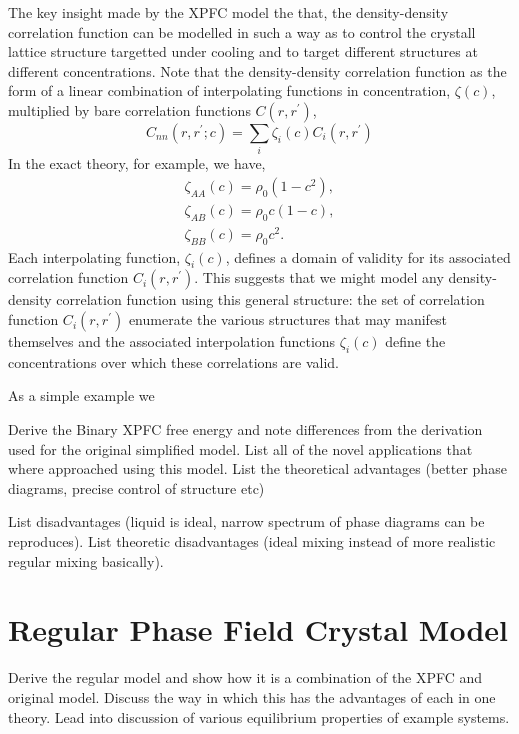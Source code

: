 The key insight made by the XPFC model the that, the density-density correlation 
function can be modelled in such a way as to control the crystall lattice structure
targetted under cooling and to target different structures at different concentrations.
Note that the density-density correlation function as the form of a linear combination
of interpolating functions in concentration, $\zeta(c)$, multiplied by bare correlation
functions $C(r, r^\prime)$,
%
\begin{equation}
    C_{nn}(r, r^\prime; c) = \sum_i \zeta_i(c) C_i(r, r^\prime)
\end{equation}
%
In the exact theory, for example, we have,
%
\begin{gather}
    \zeta_{AA}(c) = \rho_0 (1 - c^2), \\
    \zeta_{AB}(c) = \rho_0 c (1 - c ), \\
    \zeta_{BB}(c) = \rho_0 c^2.
\end{gather}
%
Each interpolating function, $\zeta_i(c)$, defines a domain of validity for its
associated correlation function $C_i(r, r^\prime)$. This suggests that we might model
any density-density correlation function using this general structure: the set of 
correlation function $C_i(r, r^\prime)$ enumerate the various structures that may
manifest themselves and the associated interpolation functions $\zeta_i(c)$ define
the concentrations over which these correlations are valid.

As a simple example we 


{
    \color{ForestGreen} Derive the Binary XPFC free energy and note differences
    from the derivation used for the original simplified model. List all of the
    novel applications that where approached using this model. List the theoretical
    advantages (better phase diagrams, precise control of structure etc)

    List disadvantages (liquid is ideal, narrow spectrum of phase diagrams can
    be reproduces). List theoretic disadvantages (ideal mixing instead of more
    realistic regular mixing basically).
}

\section{Regular Phase Field Crystal Model} %

{
    \color{ForestGreen} Derive the regular model and show how it is a combination of
    the XPFC and original model. Discuss the way in which this has the advantages
    of each in one theory. Lead into discussion of various equilibrium properties
    of example systems.

}

